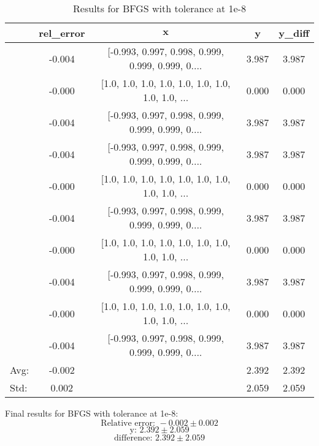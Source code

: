 \documentclass[10pt,onside]{article}
\begin{document}
\begin{description}
\begin{table}[ht]
\centering
\caption{Results for BFGS with tolerance at 1e-8}
\begin{tabular}{lcccc}
\toprule
{} &  rel\_error &  $\mathbf{x}$ &      y &  y\_diff \\
\midrule
&     -0.004 &  [-0.993, 0.997, 0.998, 0.999, 0.999, 0.999, 0.... &  3.987 &   3.987 \\
&     -0.000 &  [1.0, 1.0, 1.0, 1.0, 1.0, 1.0, 1.0, 1.0, 1.0, ... &  0.000 &   0.000 \\
&     -0.004 &  [-0.993, 0.997, 0.998, 0.999, 0.999, 0.999, 0.... &  3.987 &   3.987 \\
&     -0.004 &  [-0.993, 0.997, 0.998, 0.999, 0.999, 0.999, 0.... &  3.987 &   3.987 \\
&     -0.000 &  [1.0, 1.0, 1.0, 1.0, 1.0, 1.0, 1.0, 1.0, 1.0, ... &  0.000 &   0.000 \\
&     -0.004 &  [-0.993, 0.997, 0.998, 0.999, 0.999, 0.999, 0.... &  3.987 &   3.987 \\
&     -0.000 &  [1.0, 1.0, 1.0, 1.0, 1.0, 1.0, 1.0, 1.0, 1.0, ... &  0.000 &   0.000 \\
&     -0.004 &  [-0.993, 0.997, 0.998, 0.999, 0.999, 0.999, 0.... &  3.987 &   3.987 \\
&     -0.000 &  [1.0, 1.0, 1.0, 1.0, 1.0, 1.0, 1.0, 1.0, 1.0, ... &  0.000 &   0.000 \\
&     -0.004 &  [-0.993, 0.997, 0.998, 0.999, 0.999, 0.999, 0.... &  3.987 &   3.987 \\
\bottomrule
Avg: & -0.002 &  & 2.392 &  2.392\\
Std: & 0.002 &  & 2.059 & 2.059 \\
\bottomrule
\end{tabular}
\end{table}

Final results for BFGS with tolerance at 1e-8:\\
$$\text{Relative error: } -0.002 \pm 0.002$$
$$\text{y: } 2.392 \pm 2.059$$
$$\text{difference: } 2.392 \pm 2.059$$

\pagebreak


\end{description}
\end{document}
